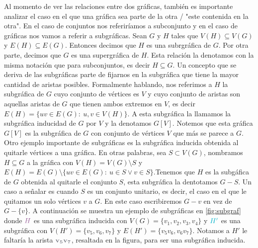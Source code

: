 Al momento de ver las relaciones entre dos gr\'aficas, tambi\'en es importante
analizar el caso en el que una gr\'afica sea parte de la otra / "este contenida
en la otra". En el caso de conjuntos nos referir\'iamos a subconjunto y en el
caso de gr\'aficas nos vamos a referir a subgr\'aficas. Sean $G$ y $H$ tales que
$V(H) \subseteq V(G)$ y $E(H) \subseteq E(G)$. Entonces decimos que $H$ es una
subrgr\'afica de $G$. Por otra parte, decimos que $G$ es una supergr\'afica de
$H$. Esta relaci\'on la denotamos con la misma notaci\'on que para subconjuntos,
es decir $H \subseteq G$. Un concepto que se deriva de las subgr\'aficas parte
de fijarnos en la subgr\'afica que tiene la mayor cantidad de aristas posibles.
Formalmente hablando, nos referimos a $H$ la subgr\'afica de $G$ cuyo conjunto
de v\'ertices es $V$ y cuyo conjunto de aristas son aquellas aristas de $G$ que
tienen ambos extremos en $V$, es decir $E(H) = \{uv \in E(G) \colon\ u,v \in
V(H)\}$. A esta subgr\'afica la llamamos la subgr\'afica inducidad de $G$ por
$V$ y la denotamos $G[V]$. Notemos que esta gr\'afica $G[V]$ es la subgr\'afica
de $G$ con conjunto de v\'ertices $V$ que m\'as se parece a $G$. Otro ejemplo
importante de subgr\'aficas es la subgr\'afica inducida obtenida al quitarle
v\'ertices a una gr\'afica. En otras palabras, sea $S \subset V(G)$, nombramos
$H \subseteq G$ a la gr\'afica con $V(H)=V(G) \setminus S$ y $E(H) =
E(G)\setminus\{uv \in E(G) \colon\ u \in S \lor v \in S\}$.Tenemos que $H$ es la
subg\'afica de $G$ obtenida al quitarle el conjunto $S$, esta subgr\'afica la
dentotamos $G-S$. Un caso a se\~{n}alar es cuando $S$ es un conjunto unitario,
es decir, el caso en el que le quitamos un solo v\'ertices $v$ a $G$. En este
caso escribiremos $G-v$ en vez de $G-\{v\}$. A continuaci\'on se muestra un
ejemplo de subgr\'aficas en \cref{fig:subgraf} donde ${\color{morado}H}$ es una
subgr\'afica inducida con $V(G) = \{v_1,v_2,v_3,v_4\}$ y ${\color{azulCielo}H'}$
es una subgr\'afica con $V(H')=\{v_5,v_6,v_7\}$ y $E(H')=\{v_5v_6,  v_6v_7\}$.
Notamos a $H'$ le faltar\'ia la arista ${\color{grisOscuro!80}\bf v_5v_7}$,
resaltada en la figura, para ser una subgr\'afica inducida.


